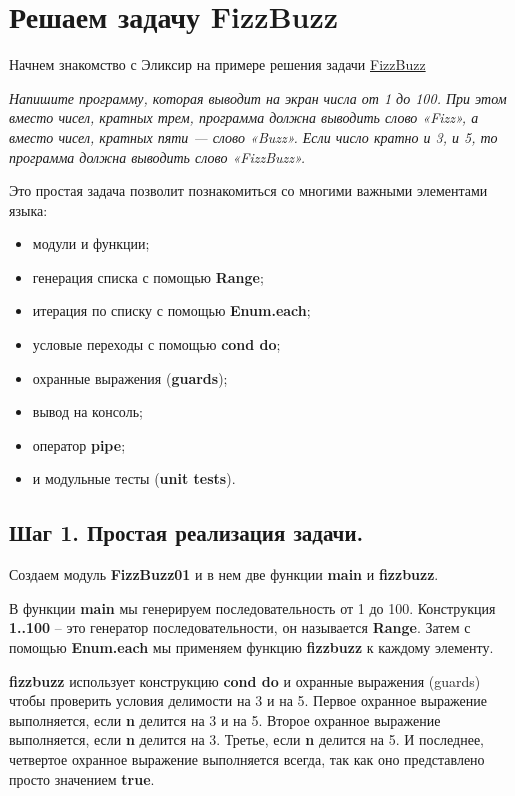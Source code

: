 \chapter{Решаем задачу FizzBuzz}

Начнем знакомство с Эликсир на примере решения задачи \href{https://ru.wikipedia.org/wiki/Fizz_buzz}{FizzBuzz}

\textit{Напишите программу, которая выводит на экран числа от 1 до 100. При этом вместо чисел, кратных трем, программа должна выводить слово «Fizz», а вместо чисел, кратных пяти — слово «Buzz». Если число кратно и 3, и 5, то программа должна выводить слово «FizzBuzz».}

Это простая задача позволит познакомиться со многими важными элементами языка:
\begin{itemize}
\item модули и функции;
\item генерация списка с помощью \textbf{Range};
\item итерация по списку с помощью \textbf{Enum.each};
\item условые переходы с помощью \textbf{cond do};
\item охранные выражения (\textbf{guards});
\item вывод на консоль;
\item оператор \textbf{pipe};
\item и модульные тесты (\textbf{unit tests}).
\end{itemize}

\section{Шаг 1. Простая реализация задачи.}

Создаем модуль \textbf{FizzBuzz01} и в нем две функции \textbf{main} и \textbf{fizzbuzz}. 



В функции \textbf{main} мы генерируем последовательность от 1 до 100. Конструкция \textbf{1..100} -- это генератор последовательности, он называется \textbf{Range}. Затем с помощью \textbf{Enum.each} мы применяем функцию \textbf{fizzbuzz} к каждому элементу.

\textbf{fizzbuzz} использует конструкцию \textbf{cond do} и охранные выражения (guards) чтобы проверить условия делимости на 3 и на 5. Первое охранное выражение выполняется, если \textbf{n} делится на 3 и на 5. Второе охранное выражение выполняется, если \textbf{n} делится на 3. Третье, если \textbf{n} делится на 5. И последнее, четвертое охранное выражение выполняется всегда, так как оно представлено просто значением \textbf{true}. 

